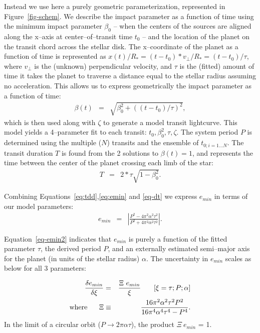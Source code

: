 Instead we use here a purely geometric parameterization, represented
in Figure~\ref{fig-schem}.  We describe the impact parameter as a
function of time using the minimum impact parameter $\beta_0$ -- when
the centers of the sources are aligned along the x--axis at
center--of--transit time $t_0$ -- and the location of the planet on
the transit chord across the stellar disk.  The x--coordinate of the
planet as a function of time is represented as $x(t) / R_* = (t - t_0)
* v_\perp / R_* = (t - t_0) / \tau$, where $v_\perp$ is the (unknown)
perpendicular velocity, and $\tau$ is the (fitted) amount of time it
takes the planet to traverse a distance equal to the stellar radius
assuming no acceleration.  This allows us to express geometrically the
impact parameter as a function of time:
\begin{eqnarray}
\beta(t) & = & \sqrt{\beta_0^2 + \left((t - t_0) / \tau\right)^2},
\end{eqnarray}
which is then used along with $\zeta$ to generate a model transit
lightcurve.
This model yields a 4--parameter fit to each transit: $t_0, \beta_0^2,
\tau, \zeta$.  The system period $P$ is determined using the
multiple ($N$) transits and the ensemble of $t_{0;i=1...N}$.  The
transit duration $T$ is found from the 2 solutions to $\beta(t) = 1$,
and represents the time between the center of the planet crossing each
limb of the star:
\begin{eqnarray}
T & = & 2 * \tau \sqrt{1 - \beta_0^2}.
\label{eq-dt}
\end{eqnarray}

Combining Equations~\ref{eq:tdd},\ref{eq:emin} and \ref{eq-dt} we express $e_{min}$ in terms of our model
parameters:
\begin{eqnarray}
e_{min} & = & \left| \frac{P^{2} - 4 \pi^{2} \alpha^{2} \tau^{2}}{P^{2} + 4 \pi^{2} \alpha^{2} \tau^{2}} \right|.
\label{eq-emin2}
\end{eqnarray}

Equation~\ref{eq-emin2} indicates that $e_{min}$ is purely a function
of the fitted parameter $\tau$, the derived period $P$, and an
externally estimated semi--major axis for the planet (in units of the
stellar radius) $\alpha$.  The uncertainty in $e_{min}$ scales as
below for all 3 parameters:

\begin{eqnarray}
\frac{\delta e_{min}}{\delta \xi} & = & \frac{\Xi~e_{min}}{\xi} ~~~~~ \left[\xi = \tau; P; \alpha \right] \\
{\rm where}~~~~~\Xi & \equiv & \frac{16 \pi^{2} \alpha^{2} \tau^{2} P^{2}}{16 \pi^{4} \alpha^{4} \tau^{4} - P^{4}}.\nonumber
\label{eq-emin3}
\end{eqnarray}
In the limit of a circular orbit ($P \rightarrow 2 \pi \alpha \tau$),
the product $\Xi~e_{min}$ = 1.

